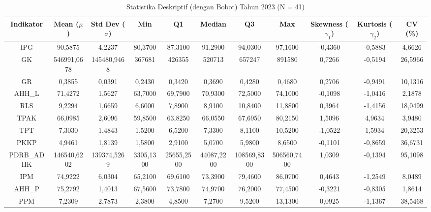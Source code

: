 \begin{table}[H]
\centering
\caption{Statistika Deskriptif (dengan Bobot) Tahun 2023 (N = 41)} \label{tab:app1desc_2023}
\begin{adjustbox}{max width=\textwidth, max height=0.85\textheight}
\begin{tabular}{|c|c|c|c|c|c|c|c|c|c|c|}
\hline
\textbf{Indikator} & \textbf{Mean ($\mu$)} & \textbf{Std Dev ($\sigma$)} & \textbf{Min} & \textbf{Q1} & \textbf{Median} & \textbf{Q3} & \textbf{Max} & \textbf{Skewness ($\gamma_1$)} & \textbf{Kurtosis ($\gamma_2$)} & \textbf{CV (\%)} \\
\hline
IPG & 90,5875 & 4,2237 & 80,3700 & 87,3100 & 91,2900 & 94,0300 & 97,1600 & -0,4360 & -0,5883 & 4,6626 \\
GK & 546991,0678 & 145480,9468 & 367681 & 426355 & 520713 & 657247 & 891580 & 0,7266 & -0,5194 & 26,5966 \\
GR & 0,3855 & 0,0391 & 0,2430 & 0,3420 & 0,3690 & 0,4280 & 0,4680 & 0,2706 & -0,9491 & 10,1316 \\
AHH\_L & 71,4272 & 1,5627 & 63,7000 & 69,7900 & 70,9300 & 72,5000 & 74,1000 & -0,1098 & -1,0416 & 2,1878 \\
RLS & 9,2294 & 1,6659 & 6,6000 & 7,8900 & 8,9100 & 10,8400 & 11,8800 & 0,3964 & -1,4156 & 18,0499 \\
TPAK & 66,0985 & 2,6096 & 59,8500 & 63,8250 & 66,0550 & 67,6950 & 80,2150 & 1,5096 & 4,9634 & 3,9480 \\
TPT & 7,3030 & 1,4843 & 1,5200 & 6,5200 & 7,3300 & 8,1100 & 10,5200 & -1,0522 & 1,5934 & 20,3253 \\
PKKP & 4,9461 & 1,8139 & 1,5800 & 2,9100 & 5,0700 & 5,9800 & 8,6500 & -0,1101 & -0,8659 & 36,6731 \\
PDRB\_ADHK & 146540,6202 & 139374,5269 & 3305,1300 & 25655,2500 & 44087,2200 & 108569,8300 & 506560,7400 & 1,0309 & -0,1394 & 95,1098 \\
IPM & 74,9222 & 6,0304 & 65,2100 & 69,6100 & 73,3900 & 79,4600 & 86,0700 & 0,4643 & -1,2549 & 8,0489 \\
AHH\_P & 75,2792 & 1,4013 & 67,5600 & 73,7800 & 74,9700 & 76,2000 & 77,4500 & -0,3221 & -0,8305 & 1,8614 \\
PPM & 7,2309 & 2,7873 & 2,3800 & 4,8500 & 7,2700 & 9,5200 & 13,1300 & 0,0925 & -1,1367 & 38,5468 \\
\hline
\end{tabular}
\end{adjustbox}
\end{table}